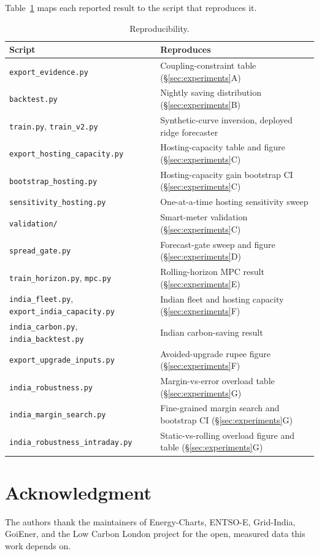 \documentclass[journal]{IEEEtran}
\begin{document}
\appendix
Table~\ref{tab:repro} maps each reported result to the script that reproduces it.
\begin{table}[h]
\centering
\caption{Reproducibility.}
\label{tab:repro}
\begin{tabular}{p{3.0cm}p{4.8cm}}
\toprule
\textbf{Script} & \textbf{Reproduces} \\
\midrule
\texttt{export\_evidence.py} & Coupling-constraint table (\S\ref{sec:experiments}A) \\
\texttt{backtest.py} & Nightly saving distribution (\S\ref{sec:experiments}B) \\
\texttt{train.py}, \texttt{train\_v2.py} & Synthetic-curve inversion, deployed ridge forecaster \\
\texttt{export\_hosting\_capacity.py} & Hosting-capacity table and figure (\S\ref{sec:experiments}C) \\
\texttt{bootstrap\_hosting.py} & Hosting-capacity gain bootstrap CI (\S\ref{sec:experiments}C) \\
\texttt{sensitivity\_hosting.py} & One-at-a-time hosting sensitivity sweep \\
\texttt{validation/} & Smart-meter validation (\S\ref{sec:experiments}C) \\
\texttt{spread\_gate.py} & Forecast-gate sweep and figure (\S\ref{sec:experiments}D) \\
\texttt{train\_horizon.py}, \texttt{mpc.py} & Rolling-horizon MPC result (\S\ref{sec:experiments}E) \\
\texttt{india\_fleet.py}, \texttt{export\_india\_capacity.py} & Indian fleet and hosting capacity (\S\ref{sec:experiments}F) \\
\texttt{india\_carbon.py}, \texttt{india\_backtest.py} & Indian carbon-saving result \\
\texttt{export\_upgrade\_inputs.py} & Avoided-upgrade rupee figure (\S\ref{sec:experiments}F) \\
\texttt{india\_robustness.py} & Margin-vs-error overload table (\S\ref{sec:experiments}G) \\
\texttt{india\_margin\_search.py} & Fine-grained margin search and bootstrap CI (\S\ref{sec:experiments}G) \\
\texttt{india\_robustness\_intraday.py} & Static-vs-rolling overload figure and table (\S\ref{sec:experiments}G) \\
\bottomrule
\end{tabular}
\end{table}

\section*{Acknowledgment}
The authors thank the maintainers of Energy-Charts, ENTSO-E, Grid-India, GoiEner, and the Low Carbon London project for the open, measured data this work depends on.
\end{document}
